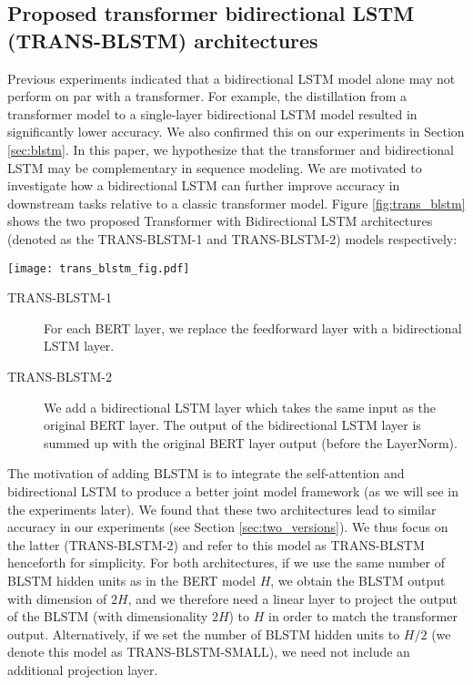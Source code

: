 \documentclass[11pt,a4paper]{article}
\begin{document}
\subsection{Proposed transformer bidirectional LSTM (TRANS-BLSTM) architectures} \label{sec:trans_blstm}
Previous experiments indicated that a bidirectional LSTM model alone may not perform on par with a transformer. For example, the distillation from a transformer model to a single-layer bidirectional LSTM model \cite{tang2019} resulted in significantly lower accuracy. We also confirmed this on our experiments in Section \ref{sec:blstm}. In this paper, we hypothesize that the transformer and bidirectional LSTM may be complementary in sequence modeling. We are motivated to investigate how a bidirectional LSTM can further improve accuracy in downstream tasks relative to a classic transformer model. Figure \ref{fig:trans_blstm} shows the two proposed Transformer with Bidirectional LSTM architectures (denoted as the TRANS-BLSTM-1 and TRANS-BLSTM-2) models respectively: 
\begin{figure*}[!hbt]
    \centering
    \texttt{[image: trans\_blstm\_fig.pdf]}
    \caption{Two transformer with bidirectional LSTM architectures. The left one, TRANS-BLSTM-1, replaces the feedforward layer with BLSTM layer and the right , TRANS-BLSTM-2, adds a BLSTM layer in parallel.}
    \label{fig:trans_blstm}
\end{figure*}
\begin{description}
\item[TRANS-BLSTM-1] For each BERT layer, we replace the feedforward layer with a bidirectional LSTM layer.
\item[TRANS-BLSTM-2]  We add a bidirectional LSTM layer which takes the same input as the original BERT layer. The output of the bidirectional LSTM layer is summed up with the original BERT layer output (before the LayerNorm). 
\end{description}
The motivation of adding BLSTM is to integrate the self-attention and bidirectional LSTM to produce a better joint model framework (as we will see in the experiments later). We found that these two architectures lead to similar accuracy in our experiments (see Section \ref{sec:two_versions}). We thus focus on the latter (TRANS-BLSTM-2) and refer to this model as TRANS-BLSTM henceforth for simplicity. For both architectures, if we use the same number of BLSTM hidden units as in the BERT model $H$, we obtain the BLSTM output with dimension of $2H$, and we therefore need a linear layer to project the output of the BLSTM (with dimensionality $2H$) to $H$ in order to match the transformer output. Alternatively, if we set the number of BLSTM hidden units to $H/2$ (we denote this model as TRANS-BLSTM-SMALL), we need not include an additional projection layer.  
\end{document}
